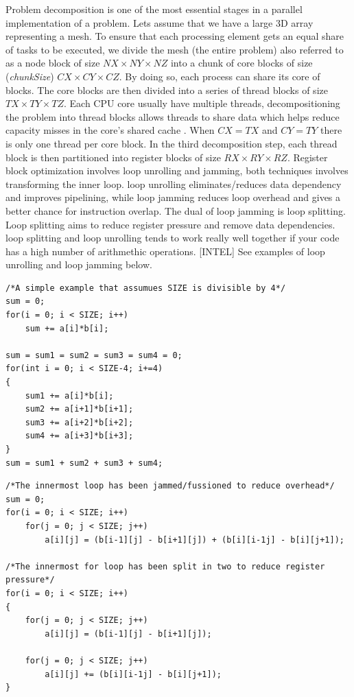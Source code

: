 Problem decomposition is one of the most essential stages in a parallel implementation of a problem. Lets assume that we have a large 3D array representing a mesh. To ensure that each processing element gets an equal share of tasks to be executed, we divide the mesh (the entire problem) also referred to as a node block of size \(NX \times NY \times NZ\) into a chunk of core blocks of size (\textit{chunkSize}) \(CX \times CY \times CZ\). By doing so, each process can share its core of blocks. The core blocks are then divided into a series of thread blocks of size \(TX \times TY \times TZ\). Each CPU core usually have multiple threads, decompositioning the problem into thread blocks allows threads to share data which helps reduce capacity misses in the core’s shared cache \cite{article9}. When \( CX = TX\) and \( CY = TY\) there is only one thread per core block. In the third decomposition step, each thread block is then partitioned into register blocks of size \(RX \times RY \times RZ\). Register block optimization involves loop unrolling and jamming, both techniques involves transforming the inner loop. loop unrolling eliminates/reduces data dependency and improves pipelining, while loop jamming reduces loop overhead and gives a better chance for instruction overlap\cite{article10}. The dual of loop jamming is loop splitting. Loop splitting aims to reduce register pressure and remove data dependencies. loop splitting and loop unrolling tends to work really well together if your code has a high number of arithmethic operations. [INTEL]  See examples of loop unrolling and loop jamming below. 

\begin{lstlisting}[caption=Loop unrolling]
/*A simple example that assumues SIZE is divisible by 4*/
sum = 0;
for(i = 0; i < SIZE; i++)
	sum += a[i]*b[i];

sum = sum1 = sum2 = sum3 = sum4 = 0;
for(int i = 0; i < SIZE-4; i+=4)
{
	sum1 += a[i]*b[i];
	sum2 += a[i+1]*b[i+1];
	sum3 += a[i+2]*b[i+2];
	sum4 += a[i+3]*b[i+3];
}
sum = sum1 + sum2 + sum3 + sum4;
\end{lstlisting}

\begin{lstlisting}[caption=Loop jamming and loop splitting]
/*The innermost loop has been jammed/fussioned to reduce overhead*/
sum = 0;
for(i = 0; i < SIZE; i++)
	for(j = 0; j < SIZE; j++)
		a[i][j] = (b[i-1][j] - b[i+1][j]) + (b[i][i-1j] - b[i][j+1]);

/*The innermost for loop has been split in two to reduce register pressure*/
for(i = 0; i < SIZE; i++)
{
	for(j = 0; j < SIZE; j++)
		a[i][j] = (b[i-1][j] - b[i+1][j]);
	
	for(j = 0; j < SIZE; j++)
		a[i][j] += (b[i][i-1j] - b[i][j+1]);
}
\end{lstlisting}


